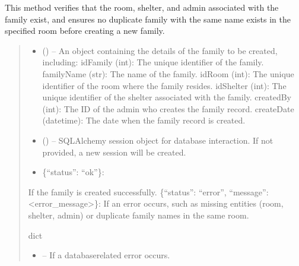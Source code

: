\documentclass[letterpaper,10pt,english]{sphinxmanual}
\begin{document}
\begin{fulllineitems}
\begin{fulllineitems}
\sphinxAtStartPar
This method verifies that the room, shelter, and admin associated with the family exist,
and ensures no duplicate family with the same name exists in the specified room before
creating a new family.
\begin{quote}\begin{description}
\begin{itemize}
\item {} 
\sphinxAtStartPar
{} () – An object containing the details of the family to be created, including:
\sphinxhyphen{} idFamily (int): The unique identifier of the family.
\sphinxhyphen{} familyName (str): The name of the family.
\sphinxhyphen{} idRoom (int): The unique identifier of the room where the family resides.
\sphinxhyphen{} idShelter (int): The unique identifier of the shelter associated with the family.
\sphinxhyphen{} createdBy (int): The ID of the admin who creates the family record.
\sphinxhyphen{} createDate (datetime): The date when the family record is created.

\item {} 
\sphinxAtStartPar
{} (\sphinxstyleliteralemphasis{\sphinxupquote{, }}) – SQLAlchemy session object for database interaction.
If not provided, a new session will be created.

\end{itemize}

\sphinxAtStartPar
\begin{description}
\begin{itemize}
\item {} 
\sphinxAtStartPar
\{“status”: “ok”\}:

\end{itemize}

\sphinxAtStartPar
If the family is created successfully.
\sphinxhyphen{} \{“status”: “error”, “message”: <error\_message>\}:
If an error occurs, such as missing entities (room, shelter, admin)
or duplicate family names in the same room.

\end{description}


\sphinxAtStartPar
dict

\begin{itemize}
\item {} 
\sphinxAtStartPar
{} – If a database\sphinxhyphen{}related error occurs.


\end{itemize}
\end{description}
\end{quote}
\end{fulllineitems}
\end{fulllineitems}
\end{document}
